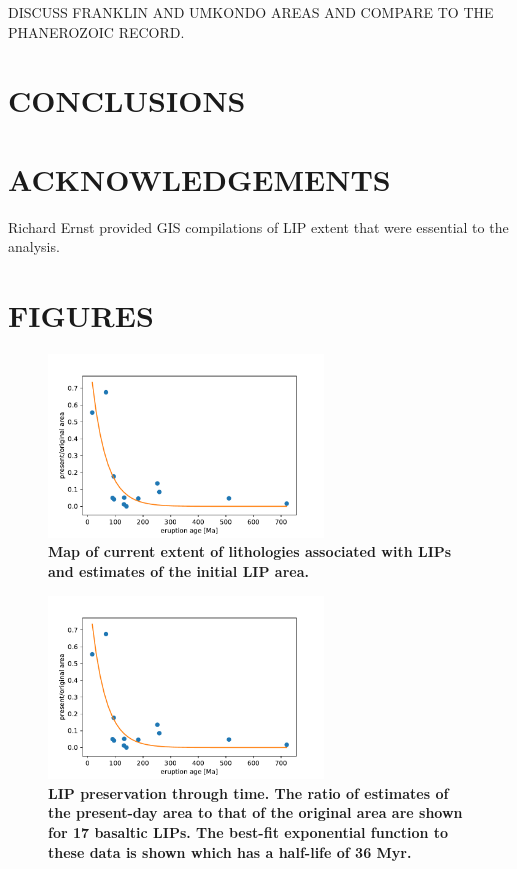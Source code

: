 \documentclass[11pt,letterpaper]{article}
\begin{document}
DISCUSS FRANKLIN AND UMKONDO AREAS AND COMPARE TO THE PHANEROZOIC RECORD. 

\section*{CONCLUSIONS}

\section*{ACKNOWLEDGEMENTS \label{sec:ACKNOWLEDGEMENTS}}

Richard Ernst provided GIS compilations of LIP extent that were essential to the analysis.

\section*{FIGURES}

\begin{figure}[h!]
\begin{center}
	\includegraphics[width=0.65\textwidth]{Manuscript/Figures/LIP_Preservation.pdf}
	\caption{\textbf{Map of current extent of lithologies associated with LIPs and estimates of the initial LIP area.}}
	\label{fig:LIP_map}
\end{center}
\end{figure}

\begin{figure}[h!]
\begin{center}
	\includegraphics[width=0.65\textwidth]{Manuscript/Figures/LIP_Preservation.pdf}
	\caption{\textbf{LIP preservation through time. The ratio of estimates of the present-day area to that of the original area are shown for 17 basaltic LIPs. The best-fit exponential function to these data is shown which has a half-life of 36 Myr.}}
	\label{fig:LIP_preservation}
\end{center}
\end{figure}
\end{document}
